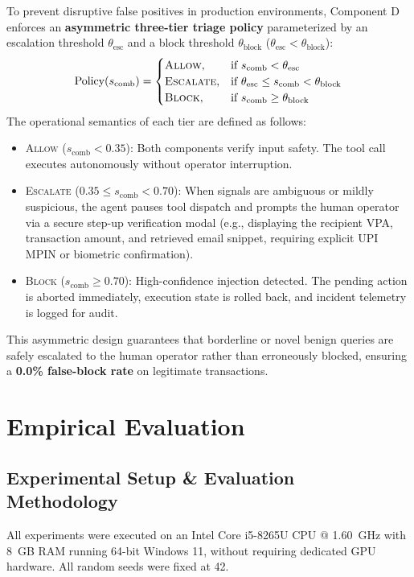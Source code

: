\documentclass[conference]{IEEEtran}
\begin{document}
To prevent disruptive false positives in production environments, Component D enforces an \textbf{asymmetric three-tier triage policy} parameterized by an escalation threshold $\theta_{\text{esc}}$ and a block threshold $\theta_{\text{block}}$ ($\theta_{\text{esc}} < \theta_{\text{block}}$):
\begin{equation}
    \text{Policy}(s_{\text{comb}}) = \begin{cases}
        \textsc{Allow}, & \text{if } s_{\text{comb}} < \theta_{\text{esc}} \\
        \textsc{Escalate}, & \text{if } \theta_{\text{esc}} \le s_{\text{comb}} < \theta_{\text{block}} \\
        \textsc{Block}, & \text{if } s_{\text{comb}} \ge \theta_{\text{block}}
    \end{cases}
\end{equation}
The operational semantics of each tier are defined as follows:
\begin{itemize}
    \item \textsc{Allow} ($s_{\text{comb}} < 0.35$): Both components verify input safety. The tool call executes autonomously without operator interruption.
    \item \textsc{Escalate} ($0.35 \le s_{\text{comb}} < 0.70$): When signals are ambiguous or mildly suspicious, the agent pauses tool dispatch and prompts the human operator via a secure step-up verification modal (e.g., displaying the recipient VPA, transaction amount, and retrieved email snippet, requiring explicit UPI MPIN or biometric confirmation).
    \item \textsc{Block} ($s_{\text{comb}} \ge 0.70$): High-confidence injection detected. The pending action is aborted immediately, execution state is rolled back, and incident telemetry is logged for audit.
\end{itemize}
This asymmetric design guarantees that borderline or novel benign queries are safely escalated to the human operator rather than erroneously blocked, ensuring a \textbf{0.0\% false-block rate} on legitimate transactions.

\section{Empirical Evaluation}
\label{sec:experiments}

\subsection{Experimental Setup \& Evaluation Methodology}
All experiments were executed on an Intel Core i5-8265U CPU @ 1.60~GHz with 8~GB RAM running 64-bit Windows 11, without requiring dedicated GPU hardware. All random seeds were fixed at 42.
\end{document}
